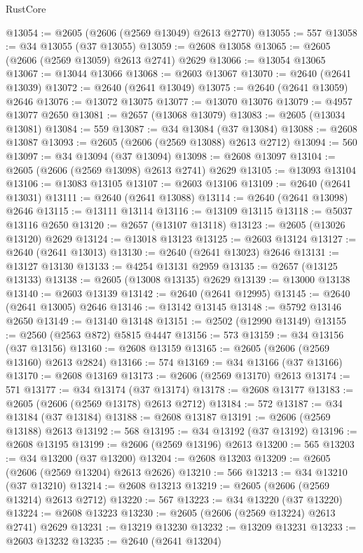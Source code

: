 \begin{lexlean}{RustCore}
\begin{coremodule}
@13054 := @2605 (@2606 (@2569 @13049) @2613 @2770)
@13055 := 557
@13058 := @34 @13055 (@37 @13055)
@13059 := @2608 @13058
@13065 := @2605 (@2606 (@2569 @13059) @2613 @2741) @2629
@13066 := @13054 @13065
@13067 := @13044 @13066
@13068 := @2603 @13067
@13070 := @2640 (@2641 @13039)
@13072 := @2640 (@2641 @13049)
@13075 := @2640 (@2641 @13059) @2646
@13076 := @13072 @13075
@13077 := @13070 @13076
@13079 := @4957 @13077 @2650
@13081 := @2657 (@13068 @13079)
@13083 := @2605 (@13034 @13081)
@13084 := 559
@13087 := @34 @13084 (@37 @13084)
@13088 := @2608 @13087
@13093 := @2605 (@2606 (@2569 @13088) @2613 @2712)
@13094 := 560
@13097 := @34 @13094 (@37 @13094)
@13098 := @2608 @13097
@13104 := @2605 (@2606 (@2569 @13098) @2613 @2741) @2629
@13105 := @13093 @13104
@13106 := @13083 @13105
@13107 := @2603 @13106
@13109 := @2640 (@2641 @13031)
@13111 := @2640 (@2641 @13088)
@13114 := @2640 (@2641 @13098) @2646
@13115 := @13111 @13114
@13116 := @13109 @13115
@13118 := @5037 @13116 @2650
@13120 := @2657 (@13107 @13118)
@13123 := @2605 (@13026 @13120) @2629
@13124 := @13018 @13123
@13125 := @2603 @13124
@13127 := @2640 (@2641 @13013)
@13130 := @2640 (@2641 @13023) @2646
@13131 := @13127 @13130
@13133 := @4254 @13131 @2959
@13135 := @2657 (@13125 @13133)
@13138 := @2605 (@13008 @13135) @2629
@13139 := @13000 @13138
@13140 := @2603 @13139
@13142 := @2640 (@2641 @12995)
@13145 := @2640 (@2641 @13005) @2646
@13146 := @13142 @13145
@13148 := @5792 @13146 @2650
@13149 := @13140 @13148
@13151 := @2502 (@12990 @13149)
@13155 := @2560 (@2563 @872) @5815 @4447
@13156 := 573
@13159 := @34 @13156 (@37 @13156)
@13160 := @2608 @13159
@13165 := @2605 (@2606 (@2569 @13160) @2613 @2824)
@13166 := 574
@13169 := @34 @13166 (@37 @13166)
@13170 := @2608 @13169
@13173 := @2606 (@2569 @13170) @2613
@13174 := 571
@13177 := @34 @13174 (@37 @13174)
@13178 := @2608 @13177
@13183 := @2605 (@2606 (@2569 @13178) @2613 @2712)
@13184 := 572
@13187 := @34 @13184 (@37 @13184)
@13188 := @2608 @13187
@13191 := @2606 (@2569 @13188) @2613
@13192 := 568
@13195 := @34 @13192 (@37 @13192)
@13196 := @2608 @13195
@13199 := @2606 (@2569 @13196) @2613
@13200 := 565
@13203 := @34 @13200 (@37 @13200)
@13204 := @2608 @13203
@13209 := @2605 (@2606 (@2569 @13204) @2613 @2626)
@13210 := 566
@13213 := @34 @13210 (@37 @13210)
@13214 := @2608 @13213
@13219 := @2605 (@2606 (@2569 @13214) @2613 @2712)
@13220 := 567
@13223 := @34 @13220 (@37 @13220)
@13224 := @2608 @13223
@13230 := @2605 (@2606 (@2569 @13224) @2613 @2741) @2629
@13231 := @13219 @13230
@13232 := @13209 @13231
@13233 := @2603 @13232
@13235 := @2640 (@2641 @13204)

\end{coremodule}
\end{lexlean}
